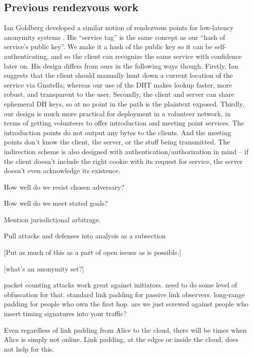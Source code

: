 \documentclass[times,10pt,twocolumn]{article}
\begin{document}
\subsection{Previous rendezvous work}

Ian Goldberg developed a similar notion of rendezvous points for
low-latency anonymity systems \cite{ian-thesis}. His ``service tag''
is the same concept as our ``hash of service's public key''. We make it
a hash of the public key so it can be self-authenticating, and so the
client can recognize the same service with confidence later on. His
design differs from ours in the following ways though. Firstly, Ian
suggests that the client should manually hunt down a current location of
the service via Gnutella; whereas our use of the DHT makes lookup faster,
more robust, and transparent to the user. Secondly, the client and server
can share ephemeral DH keys, so at no point in the path is the plaintext
exposed. Thirdly, our design is much more practical for deployment in a
volunteer network, in terms of getting volunteers to offer introduction
and meeting point services. The introduction points do not output any
bytes to the clients. And the meeting points don't know the client,
the server, or the stuff being transmitted. The indirection scheme
is also designed with authentication/authorization in mind -- if the
client doesn't include the right cookie with its request for service,
the server doesn't even acknowledge its existence.


How well do we resist chosen adversary?

How well do we meet stated goals?

Mention jurisdictional arbitrage.

Pull attacks and defenses into analysis as a subsection

\label{sec:maintaining-anonymity}

[Put as much of this as a part of open issues as is possible.]

[what's an anonymity set?]

packet counting attacks work great against initiators. need to do some
level of obfuscation for that. standard link padding for passive link
observers. long-range padding for people who own the first hop. are
we just screwed against people who insert timing signatures into your
traffic?

Even regardless of link padding from Alice to the cloud, there will be
times when Alice is simply not online. Link padding, at the edges or
inside the cloud, does not help for this.
\end{document}
